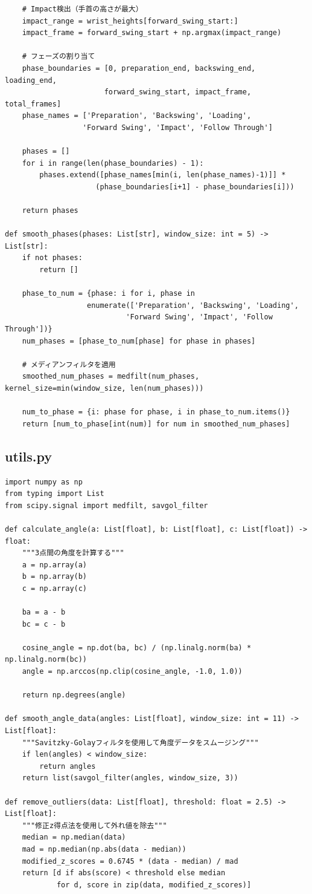 \documentclass[oneside]{suribt}[11pt]
\begin{document}
\begin{lstlisting}
    # Impact検出（手首の高さが最大）
    impact_range = wrist_heights[forward_swing_start:]
    impact_frame = forward_swing_start + np.argmax(impact_range)

    # フェーズの割り当て
    phase_boundaries = [0, preparation_end, backswing_end, loading_end, 
                       forward_swing_start, impact_frame, total_frames]
    phase_names = ['Preparation', 'Backswing', 'Loading', 
                  'Forward Swing', 'Impact', 'Follow Through']

    phases = []
    for i in range(len(phase_boundaries) - 1):
        phases.extend([phase_names[min(i, len(phase_names)-1)]] * 
                     (phase_boundaries[i+1] - phase_boundaries[i]))

    return phases

def smooth_phases(phases: List[str], window_size: int = 5) -> List[str]:
    if not phases:
        return []
    
    phase_to_num = {phase: i for i, phase in 
                   enumerate(['Preparation', 'Backswing', 'Loading', 
                            'Forward Swing', 'Impact', 'Follow Through'])}
    num_phases = [phase_to_num[phase] for phase in phases]
    
    # メディアンフィルタを適用
    smoothed_num_phases = medfilt(num_phases, kernel_size=min(window_size, len(num_phases)))
    
    num_to_phase = {i: phase for phase, i in phase_to_num.items()}
    return [num_to_phase[int(num)] for num in smoothed_num_phases]
\end{lstlisting}

\subsection{utils.py}
\begin{lstlisting}
import numpy as np
from typing import List
from scipy.signal import medfilt, savgol_filter

def calculate_angle(a: List[float], b: List[float], c: List[float]) -> float:
    """3点間の角度を計算する"""
    a = np.array(a)
    b = np.array(b)
    c = np.array(c)
    
    ba = a - b
    bc = c - b
    
    cosine_angle = np.dot(ba, bc) / (np.linalg.norm(ba) * np.linalg.norm(bc))
    angle = np.arccos(np.clip(cosine_angle, -1.0, 1.0))
    
    return np.degrees(angle)

def smooth_angle_data(angles: List[float], window_size: int = 11) -> List[float]:
    """Savitzky-Golayフィルタを使用して角度データをスムージング"""
    if len(angles) < window_size:
        return angles
    return list(savgol_filter(angles, window_size, 3))

def remove_outliers(data: List[float], threshold: float = 2.5) -> List[float]:
    """修正z得点法を使用して外れ値を除去"""
    median = np.median(data)
    mad = np.median(np.abs(data - median))
    modified_z_scores = 0.6745 * (data - median) / mad
    return [d if abs(score) < threshold else median 
            for d, score in zip(data, modified_z_scores)]
\end{lstlisting}
\end{document}
